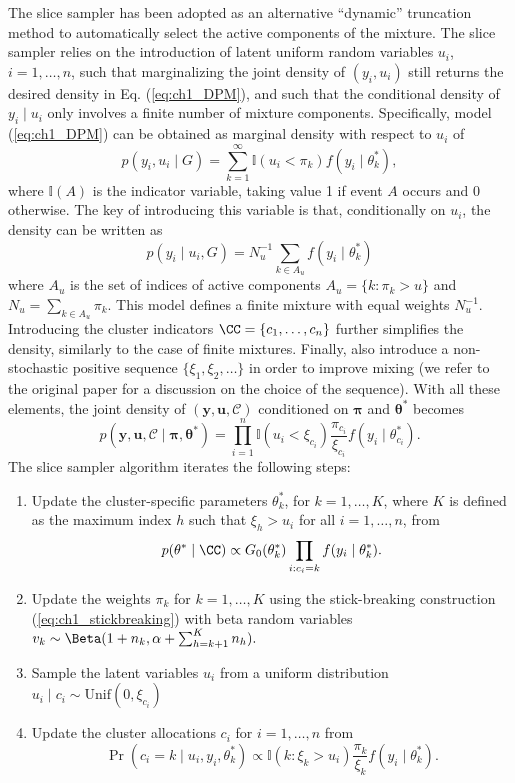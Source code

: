 The slice sampler \citep{walker2007, kalli2011} has been adopted as an alternative ``dynamic'' truncation method to automatically select the active components of the mixture. 
The slice sampler relies on the introduction of latent uniform random variables $u_i$, $i=1,\dots,n$, such that 
marginalizing the joint density of $(y_i,u_i)$ still returns the desired density in Eq. (\ref{eq:ch1_DPM}), and such that the conditional density of $y_i\mid u_i$ only involves a finite number of mixture components.
Specifically, model (\ref{eq:ch1_DPM}) can be obtained as marginal density with respect to $u_i$ of
\begin{equation*}
p(y_i,u_i\mid G) = \sum_{k=1}^{\infty} \mathbb{I}(u_i<\pi_k) f(y_i\mid\theta^*_k),
\end{equation*}
where $\mathbb{I}(A)$ is the indicator variable, taking value 1 if event $A$ occurs and 0 otherwise. 
The key of introducing this variable is that, conditionally on $u_i$, the density can be written as
\begin{equation*}
p(y_i\mid u_i, G) = N_u^{-1} \sum_{k\in A_u} f(y_i\mid\theta^*_k)
\end{equation*}
where $A_u$ is the set of indices of active components $A_u = \{k:\pi_k >u\}$ and $N_u = \sum_{k\in A_u} \pi_k$. This model defines a finite mixture with equal weights $N_u^{-1}$.
Introducing the cluster indicators $\CC = \{c_1,\dots,c_n\}$ further simplifies the density, similarly to the case of finite mixtures. Finally, \citet{kalli2011} also introduce a non-stochastic positive sequence $\{\xi_1,\xi_2,\dots\}$ in order to improve mixing (we refer to the original paper for a discussion on the choice of the sequence). With all these elements, the joint density of $(\bm{y},\bm{u},\mathcal{C})$ conditioned on $\bm{\pi}$ and $\bm{\theta}^*$ becomes
\begin{equation}
p(\bm{y},\bm{u},\mathcal{C} \mid \bm{\pi},\bm{\theta}^*) = \prod_{i=1}^n \mathbb{I}(u_i < \xi_{c_i}) \frac{\pi_{c_i}}{\xi_{c_i}} f(y_i\mid\theta^*_{c_i}).
\label{eq:ch1_sliceDPMlik}
\end{equation}
The slice sampler algorithm iterates the following steps:
\begin{enumerate}
	\item Update the cluster-specific parameters $\theta^*_k$, for $k=1,\dots,K$, where $K$ is defined as the maximum index $h$ such that $\xi_h > u_i$ for all $i=1,\dots,n$, from
	$$p(\theta^*\mid \CC) \propto G_0(\theta^*_k)\prod_{i:c_i=k} f(y_i\mid\theta^*_k).$$
	\item Update the weights $\pi_k$ for $k=1,\dots,K$ using the stick-breaking construction (\ref{eq:ch1_stickbreaking}) with beta random variables $v_k\sim\Beta(1+n_k, \alpha + \sum_{h=k+1}^K n_h).$
	\item Sample the latent variables $u_i$ from a uniform distribution $u_i \mid c_i \sim \mathrm{Unif}(0,\xi_{c_i})$
	\item Update the cluster allocations $c_i$ for $i=1,\dots,n$ from
	$$\Pr(c_i = k\mid u_i, y_i, \theta^*_k)\propto \mathbb{I}(k:\xi_k > u_i) \frac{\pi_k}{\xi_k} f(y_i\mid\theta^*_k).$$
\end{enumerate}



